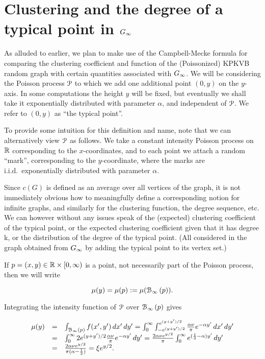 


\section{Clustering and the degree of a typical point in \texorpdfstring{$G_{\infty}$}{G infinity}\label{sec:Ginf}\label{sec:asymptotics_average_clustering_ast_P}}


As alluded to earlier, we plan to make use of the Campbell-Mecke formula for comparing the clustering coefficient and function of the (Poissonized) KPKVB random graph 
with certain quantities associated with $G_{\infty}$.
We will be considering the Poisson process ${\mathcal P}$ to which we add one additional point $(0,y)$ on the $y$-axis.
In some computations the height $y$ will be fixed, but eventually we shall take it exponentially distributed with parameter $\alpha$, and
independent of ${\mathcal P}$.
We refer to $(0,y)$ as ``the typical point''.

To provide some intuition for this definition and name, note that we can alternatively view ${\mathcal P}$ as follows. 
We take a constant intensity Poisson process on ${\mathbb R}$ corresponding to the $x$-coordinates, and to each point
we attach a random ``mark'', corresponding to the $y$-coordinate, where the marks are i.i.d.~exponentially distributed with parameter $\alpha$.


Since $c(G)$ is defined as an average over all vertices of the graph, it is not immediately obvious how to meaningfully define 
a corresponding notion for infinite graphs, and similarly for the clustering function, the degree sequence, etc.
We can however without any issues speak of the (expected) clustering coefficient of the typical point, or the expected clustering
coefficient given that it has degree k, or the distribution of the degree of the typical point.
(All considered in the graph obtained from $G_{\infty}$ by adding the typical point to its vertex set.)

If $p = (x,y) \in {\mathbb R}\times[0,\infty)$ is a point, not necessarily part of the Poisson process, then we will write

$$ \mu(y) = \mu(p) := \mu({\mathcal B}_{\infty}\left(p\right)). $$

Integrating the intensity function of ${\mathcal P}$ over ${\mathcal B}_{\infty}\left(p\right)$ gives

$$ \begin{array}{rcl} 
\mu(y) & = & \int_{{\mathcal B}_{\infty}\left(p\right)} f(x',y') \, dx' \,d y'  
 = \int_0^\infty \int_{-e^{(y+y')/2}}^{e^{(y+y')/2}} \frac{\alpha \nu}{\pi} e^{-\alpha y'} \, dx' \, dy' \\
& = & \int_0^\infty 2 e^{(y+y')/2} \frac{\alpha \nu}{\pi} e^{-\alpha y'} \, dy' 
 = \frac{2\alpha \nu e^{y/2}}{\pi} \int_0^\infty e^{(\frac12-\alpha)y'} \, dy' \\
& = & \frac{2\alpha \nu e^{y/2}}{\pi(\alpha-\frac12)} = \xi e^{y/2}.
\end{array} $$





